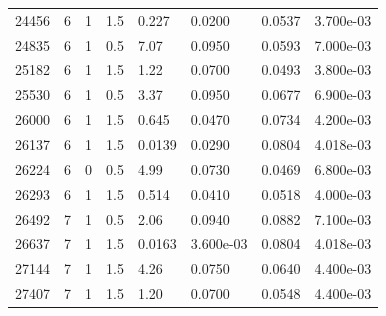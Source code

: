\documentclass[preview]{standalone}
\begin{document}
{{{\begin{tabular}{L{1.2cm}C{1.2cm} C{0.3cm}C{0.5cm} C{1.4cm}C{1.4cm} C{1.4cm}C{1.4cm}}
  24456  &     6  & 1     & 1.5 &  0.227  & 0.0200  & 0.0537 &  3.700e-03   \\ 
  24835  &     6  & 1     & 0.5 &  7.07  & 0.0950  & 0.0593 &  7.000e-03   \\ 
  25182  &     6  & 1     & 1.5 &  1.22  & 0.0700  & 0.0493 &  3.800e-03   \\ 
  25530  &     6  & 1     & 0.5 &  3.37  & 0.0950  & 0.0677 &  6.900e-03   \\ 
  26000  &     6  & 1     & 1.5 &  0.645  & 0.0470  & 0.0734 &  4.200e-03   \\ 
  26137  &     6  & 1     & 1.5 &  0.0139  & 0.0290  & 0.0804 &  4.018e-03   \\ 
  26224  &     6  & 0     & 0.5 &  4.99  & 0.0730  & 0.0469 &  6.800e-03   \\ 
  26293  &     6  & 1     & 1.5 &  0.514  & 0.0410  & 0.0518 &  4.000e-03   \\ 
  26492  &     7  & 1     & 0.5 &  2.06  & 0.0940  & 0.0882 &  7.100e-03   \\ 
  26637  &     7  & 1     & 1.5 &  0.0163  & 3.600e-03  & 0.0804 &  4.018e-03   \\ 
  27144  &     7  & 1     & 1.5 &  4.26  & 0.0750  & 0.0640 &  4.400e-03   \\ 
  27407  &     7  & 1     & 1.5 &  1.20  & 0.0700  & 0.0548 &  4.400e-03   \\ 
\hline 
\end{tabular} 

}}}
\end{document}
